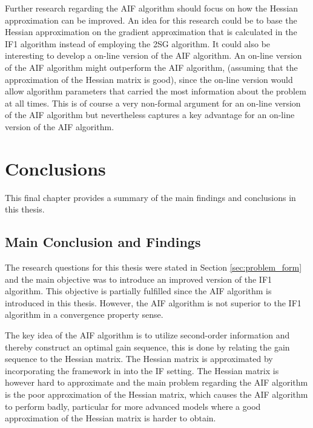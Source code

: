 \documentclass[twoside,openright]{report}
\begin{document}
Further research regarding the AIF algorithm should focus on how the Hessian approximation can be improved. An idea for this research could be to base the Hessian approximation on the gradient approximation that is calculated in the IF1 algorithm instead of employing the 2SG algorithm.  It could also be interesting to develop a on-line version of the AIF algorithm. An on-line version of the AIF algorithm might outperform the AIF algorithm, (assuming that the approximation of the Hessian matrix is good), since the on-line version would allow algorithm parameters that carried the most information about the problem at all times. This is of course a very non-formal argument  for an on-line version of the AIF algorithm but nevertheless captures a key advantage for an on-line version of the AIF algorithm.  


\chapter{Conclusions} \label{chap:conclusions}
This final chapter provides a summary of the main findings and conclusions in this thesis.


\section{Main Conclusion and Findings}
The research questions for this thesis were stated in Section \ref{sec:problem_form} and the main objective was to introduce an improved version of the IF1 algorithm. This objective is partially fulfilled since the AIF algorithm is introduced in this thesis. However, the AIF algorithm is not superior to the IF1 algorithm in a convergence property sense. 

The key idea of the AIF algorithm is to utilize second-order information and thereby construct an optimal gain sequence, this is done by relating the gain sequence to the Hessian matrix. The Hessian matrix is approximated by incorporating the framework in \cite{spall2005introduction} into the IF setting.  The Hessian matrix is however hard to approximate and the main problem regarding the AIF algorithm is the poor approximation of the Hessian matrix, which causes the AIF algorithm to perform badly, particular for more advanced models where a good approximation of the Hessian matrix is harder to obtain. 
\end{document}
